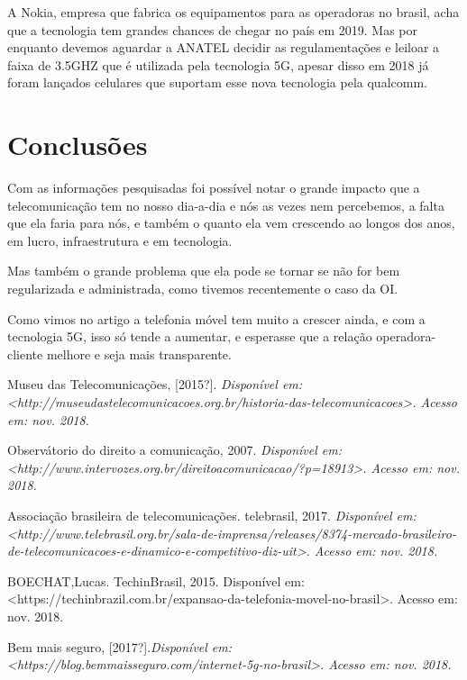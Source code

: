 \documentclass{sbrt2018port}
\begin{document}
A Nokia, empresa que fabrica os equipamentos para as operadoras no brasil, acha que a tecnologia tem grandes chances de chegar no país em 2019. Mas por enquanto devemos aguardar a ANATEL decidir as regulamentações e leiloar a faixa de 3.5GHZ que é utilizada pela tecnologia 5G, apesar disso em 2018 já foram lançados celulares que suportam esse nova tecnologia pela qualcomm.

\section{Conclusões}
\label{s_concl}

Com as informações pesquisadas foi possível notar o grande impacto que a telecomunicação tem no nosso dia-a-dia e nós as vezes nem percebemos, a falta que ela faria para nós, e também o quanto ela vem crescendo ao longos dos anos, em lucro, infraestrutura e em tecnologia.

Mas também o grande problema que ela pode se tornar se não for bem regularizada e administrada, como tivemos recentemente o caso da OI.

Como vimos no artigo a telefonia móvel tem muito a crescer ainda, e com a tecnologia 5G, isso só tende a aumentar, e esperasse que a relação operadora-cliente melhore e seja mais transparente.


\begin{thebibliography}{99}
Museu das Telecomunicações, [2015?].
\emph{Disponível em: <http://museudastelecomunicacoes.org.br/historia-das-telecomunicacoes>. Acesso em: nov. 2018.}

Observátorio do direito a comunicação, 2007.
\emph{Disponível em: <http://www.intervozes.org.br/direitoacomunicacao/?p=18913>. Acesso em: nov. 2018.}

Associação brasileira de telecomunicações. telebrasil, 2017. 
\emph{Disponível em: <http://www.telebrasil.org.br/sala-de-imprensa/releases/8374-mercado-brasileiro-de-telecomunicacoes-e-dinamico-e-competitivo-diz-uit>. Acesso em: nov. 2018.}

BOECHAT,Lucas. TechinBrasil, 2015. Disponível em: <https://techinbrazil.com.br/expansao-da-telefonia-movel-no-brasil>. Acesso em: nov. 2018.

Bem mais seguro, [2017?].\emph{Disponível em: <https://blog.bemmaisseguro.com/internet-5g-no-brasil>. Acesso em: nov. 2018.}

\end{thebibliography}
\end{document}
